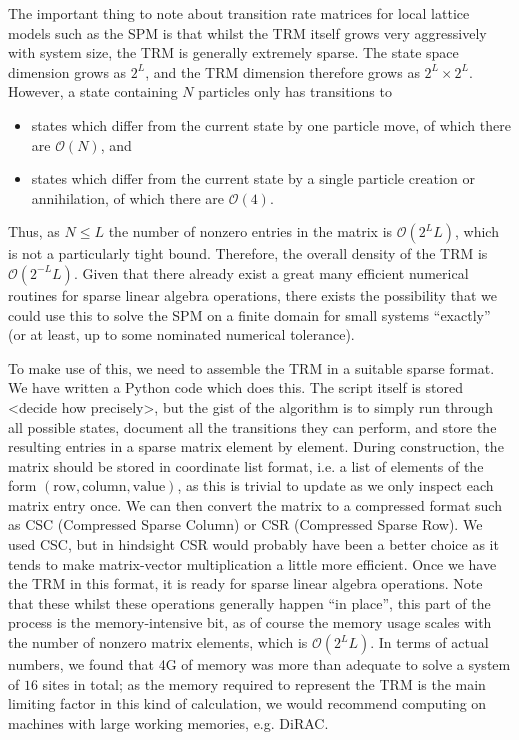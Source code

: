 The important thing to note about transition rate matrices for local lattice models
such as the SPM is that whilst the TRM itself grows very aggressively with system size, the TRM is generally extremely sparse.
The state space dimension grows as $2^L$, and the TRM dimension therefore grows as
$2^L \times 2^L$. However, a state containing $N$ particles only has transitions to
\begin{itemize}
 \item states which differ from the current state by one particle move, of which there
 are $\mathcal{O}(N)$, and
 \item states which differ from the current state by a single particle creation or
 annihilation, of which there are $\mathcal{O}(4)$.
\end{itemize}
Thus, as $N \le L$ the number of nonzero entries in the matrix is 
$\mathcal{O}(2^{L}L)$,
which is not a particularly tight bound. Therefore, the overall density of the TRM
is $\mathcal{O}(2^{-L}L)$. Given that there already exist a great many efficient
numerical routines for sparse linear algebra operations, there exists the possibility
that we could use this to solve the SPM on a finite domain for small systems
``exactly'' (or at least, up to some nominated numerical tolerance).

To make use of this, we need to assemble the TRM in a suitable sparse format.
We have written a Python code which does this. The script itself is stored <decide how 
precisely>, but the gist of the algorithm is to simply run through all possible states,
document all the transitions they can perform, and store the resulting entries in
a sparse matrix element by element. During construction, the matrix should be stored in
coordinate list format, i.e. a list of elements of the form $(\mathrm{row}, 
\mathrm{column}, \mathrm{value})$, as this is trivial to update as we only inspect
each matrix entry once. We can then convert the matrix to a compressed format such
as CSC (Compressed Sparse Column) or CSR (Compressed Sparse Row). We used CSC, but in
hindsight CSR would probably have been a better choice as it tends to make
matrix-vector multiplication a little more efficient. Once we have the TRM in this
format, it is ready for sparse linear algebra operations. Note that these whilst
these operations generally happen ``in place'', this part of the process is the
memory-intensive bit, as of course the memory usage scales with the number of nonzero
matrix elements, which is $\mathcal{O}(2^{L}L)$.
In terms of actual numbers, we found
that 4G of memory was more than adequate to solve a system of $16$ sites in total;
as the memory required to represent the TRM is the main limiting factor in this kind of
calculation, we would recommend computing on machines with large working memories,
e.g. DiRAC.


